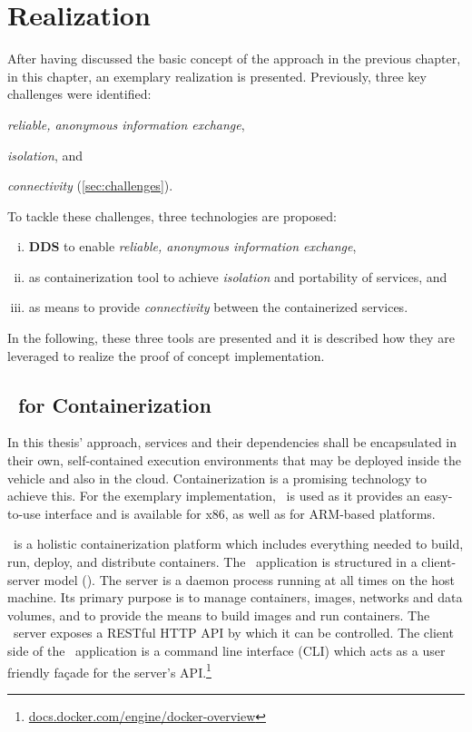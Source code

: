 \chapter{Realization} \label{chapter:realization}
After having discussed the basic concept of the approach in the previous chapter, in this chapter, an exemplary realization is presented. Previously, three key challenges were identified:
\begin{inparaenum}[(i)]
  \item \emph{reliable, anonymous information exchange},
  \item \emph{isolation}, and
  \item \emph{connectivity} (\cf \ref{sec:challenges}).
\end{inparaenum}
To tackle these challenges, three technologies are proposed:

\begin{enumerate}[(i)]
\item \textbf{DDS} to enable \emph{reliable, anonymous information exchange},
\item \textbf{\docker} as containerization tool to achieve \emph{isolation} and portability of services, and
\item \textbf{\wnet} as means to provide \emph{connectivity} between the containerized services.
\end{enumerate}

In the following, these three tools are presented and it is described how they are leveraged to realize the proof of concept implementation.




%
%
%
%
%
%
%
%
%
%

\section{\docker\ for Containerization}
In this thesis' approach, services and their dependencies shall be encapsulated in their own, self-contained execution environments that may be deployed inside the vehicle and also in the cloud. Containerization is a promising technology to achieve this. For the exemplary implementation, \docker\ is used as it provides an easy-to-use interface and is available for x86, as well as for ARM-based platforms.

\docker\ is a holistic containerization platform which includes everything needed to build, run, deploy, and distribute containers. The \docker\ application is structured in a client-server model (\cf {}). The server is a daemon process running at all times on the host machine. Its primary purpose is to manage containers, images, networks and data volumes, and to provide the means to  build images and run containers. The \docker\ server exposes a RESTful HTTP API by which it can be controlled. The client side of the \docker\ application is a command line interface (CLI) which acts as a user friendly façade for the server's API.\footnote{\url{docs.docker.com/engine/docker-overview}}

